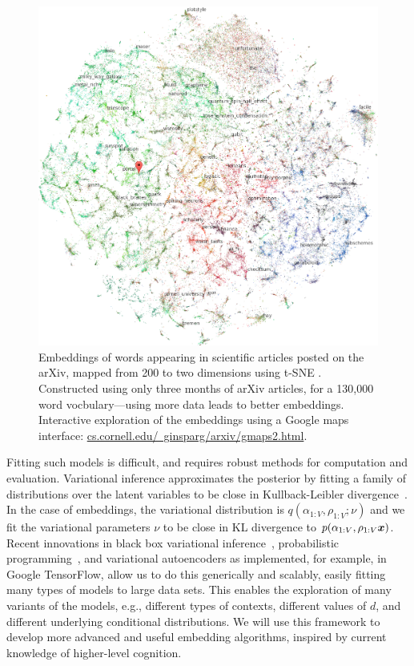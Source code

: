 \setlength{\columnsep}{20pt}
\begin{figure}
\centering
\includegraphics[width=.44\textwidth]{figs/ginsparg}
\caption{\small Embeddings of words appearing in scientific articles
posted on the arXiv, mapped from 200 to two dimensions using
t-SNE \citep{ginsparg}. Constructed using only three months of
arXiv articles, for a 130,000 word vocbulary---using more data
leads to better embeddings.
Interactive exploration of the embeddings
using a Google maps interface: \href{http://www.cs.cornell.edu/~ginsparg/arxiv/gmaps2.html}{cs.cornell.edu/~ginsparg/arxiv/gmaps2.html}.
}
    \label{fig:arxiv}
    \vskip2pt
\end{figure}

Fitting such models is difficult, and requires robust methods for
computation and evaluation.  Variational inference approximates the
posterior by fitting a family of distributions over the latent
variables to be close in Kullback-Leibler
divergence~\citep{Jordan:1999,Blei:2017}.  In the case of embeddings,
the variational distribution is $q(\alpha_{1:V}, \rho_{1:V} ; \nu)$
and we fit the variational parameters $\nu$ to be close in KL
divergence to $p(\alpha_{1:V}, \rho_{1:V} \g \mbx)$.  Recent
innovations in black box variational inference~\citep{Ranganath:2014},
probabilistic programming~\citep{Kucukelbir:2017,Tran:2017}, and
variational autoencoders
\citep{kingma} as implemented, for example, in Google TensorFlow, allow us to do this generically and
scalably, easily fitting many types of models to large
data sets.  This enables the exploration of many variants of the
models, e.g., different types of contexts, different values of $d$,
and different underlying conditional distributions. We will use
this framework to develop more advanced and useful embedding
algorithms, inspired by current knowledge of higher-level cognition.



